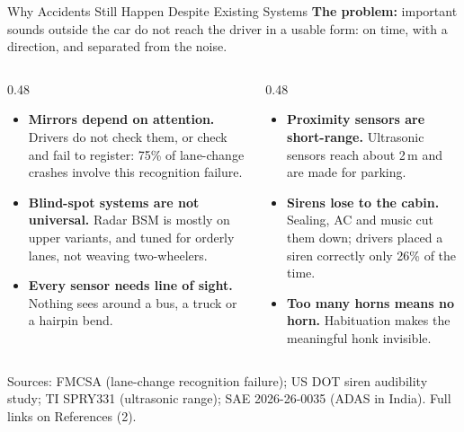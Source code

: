 \documentclass[aspectratio=169,10pt,t,xcolor=table]{beamer}
\newcommand{\src}[1]{{\tiny\color{muted}#1}}
\begin{document}
\begin{frame}{Why Accidents Still Happen Despite Existing Systems}
\vspace{-0.15cm}
{\small\textbf{The problem:} important sounds outside the car do not reach the driver in a usable form: on time, with a direction, and separated from the noise.}
\vspace{4pt}
\begin{columns}[T]
\begin{column}{0.48\textwidth}
\begin{itemize}\footnotesize
  \item \textbf{Mirrors depend on attention.} Drivers do not check them, or check and fail to register: 75\% of lane-change crashes involve this recognition failure.
  \item \textbf{Blind-spot systems are not universal.} Radar BSM is mostly on upper variants, and tuned for orderly lanes, not weaving two-wheelers.
  \item \textbf{Every sensor needs line of sight.} Nothing sees around a bus, a truck or a hairpin bend.
\end{itemize}
\end{column}
\begin{column}{0.48\textwidth}
\begin{itemize}\footnotesize
  \item \textbf{Proximity sensors are short-range.} Ultrasonic sensors reach about 2\,m and are made for parking.
  \item \textbf{Sirens lose to the cabin.} Sealing, AC and music cut them down; drivers placed a siren correctly only 26\% of the time.
  \item \textbf{Too many horns means no horn.} Habituation makes the meaningful honk invisible.
\end{itemize}
\end{column}
\end{columns}
\vspace{3pt}
\vfill
\src{Sources: FMCSA (lane-change recognition failure); US DOT siren audibility study; TI SPRY331 (ultrasonic range); SAE 2026-26-0035 (ADAS in India). Full links on References (2).}
\end{frame}
\end{document}
